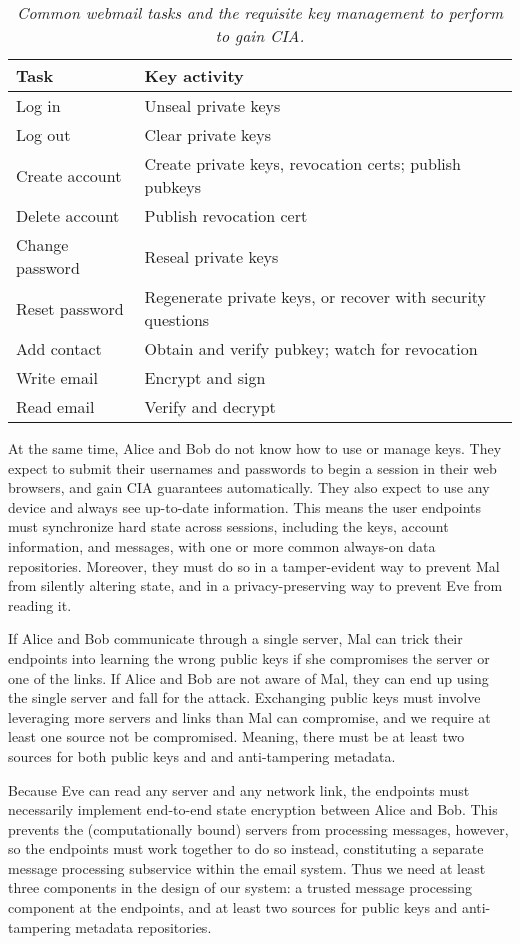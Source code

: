 \begin{table}[ht!]
\begin{tabular}{ | l | L{4.5cm} |}
\hline
\textbf{Task} & \textbf{Key activity} \\
\hline
Log in & Unseal private keys \\
Log out & Clear private keys \\
\hline
Create account & Create private keys, revocation certs; publish pubkeys \\
Delete account & Publish revocation cert \\
Change password & Reseal private keys \\
Reset password & Regenerate private keys, or recover with security questions \\
\hline
Add contact & Obtain and verify pubkey; watch for revocation \\
\hline
Write email & Encrypt and sign \\
Read email & Verify and decrypt \\
\hline
\end{tabular}
\caption{\it Common webmail tasks and the requisite key management to perform to gain CIA.}
\label{tab:user-experience}
\end{table}

At the same time, Alice and Bob do not know how to use or manage keys. 
They expect to submit their usernames and passwords to begin a session 
in their web browsers, and gain CIA guarantees automatically.  They 
also expect to use any device and always see up-to-date information.  
This means the user endpoints must synchronize hard state across sessions, 
including the keys, account information, and messages, with one or more 
common always-on data repositories.  Moreover, they must do so in a 
tamper-evident way to prevent Mal from silently altering state, and 
in a privacy-preserving way to prevent Eve from reading it.

If Alice and Bob communicate through a single server, Mal can trick 
their endpoints into learning the wrong public keys if she compromises 
the server or one of the links.  If Alice and Bob are not aware of Mal,
they can end up using the single server and fall for the attack.
 Exchanging public keys must involve 
leveraging more servers and links than Mal can compromise, and we
require at least one source not be compromised.  Meaning, 
there must be at least two sources for both public keys and and 
anti-tampering metadata.

Because Eve can read any server and any network link, the endpoints 
must necessarily implement end-to-end state encryption between Alice 
and Bob.  This prevents the (computationally bound) servers from 
processing messages, however, so the endpoints must work together 
to do so instead, constituting a separate message processing subservice 
within the email system.  Thus we need at least three components in the 
design of our system: a trusted message processing component at the 
endpoints, and at least two sources for public keys and anti-tampering metadata 
repositories.

